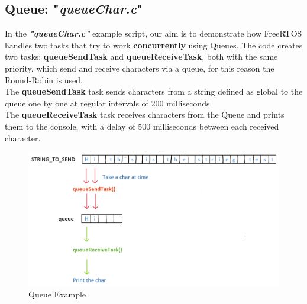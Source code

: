 \documentclass{article}
\begin{document}
\subsection{Queue: "\textit{queueChar.c}"}
In the \textit{\textbf{"queueChar.c"}} example script, our aim is to demonstrate how FreeRTOS handles two tasks that try to work \textbf{concurrently} using Queues. The code creates two tasks: \textbf{queueSendTask} and \textbf{queueReceiveTask}, both with the same priority, which send and receive characters via a queue, for this reason the Round-Robin is used.\\[0.1cm]
The \textbf{queueSendTask} task sends characters from a string defined as global to the queue one by one at regular intervals of 200 milliseconds.\\[0.1cm]
The \textbf{queueReceiveTask} task receives characters from the Queue and prints them to the console, with a delay of 500 milliseconds between each received character.
\begin{figure}[H]
    \centering
    \includegraphics[width=0.8\linewidth]{queue.png}
    \caption{Queue Example}
\end{figure}\noindent
\end{document}
